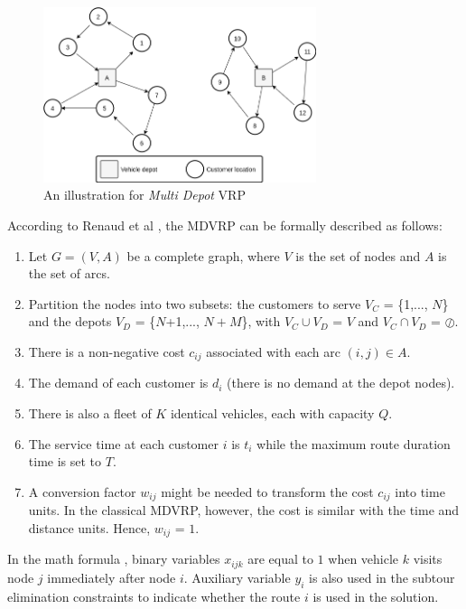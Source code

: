 \documentclass[conference]{IEEEtran}
\begin{document}
\begin{figure}[!]
	\centering
	\includegraphics[width=8cm]{Resources/Images/mdvrp-illustration}
	\caption{An illustration for \textit{Multi Depot} VRP}
	\label{fig:mdvrp-illustration}
\end{figure}


According to Renaud et al \cite{renaud_tabu_1996}, the MDVRP can be formally described as follows:
\begin{enumerate}
	\item Let $G = (V, A)$ be a complete graph, where $V$ is the set of nodes and $A$ is the set of arcs. 
	\item Partition the nodes into two subsets: the customers to serve $V_C$ = \{1,..., $N$\} and the depots $V_D$ = \{$N$+1,..., $N+M$\}, with $V_C \cup V_D$ = $V$ and $V_C \cap V_D$ = $\oslash$. 
	\item There is a non-negative cost $c_{ij}$ associated with each arc $(i, j) \in A$. 
	\item The demand of each customer is $d_i$ (there is no demand at the depot nodes).
	\item There is also a fleet of $K$ identical vehicles, each with capacity $Q$.
	\item The service time at each customer $i$ is $t_i$ while the maximum route duration time is set to $T$.
	\item A conversion factor $w_{ij}$ might be needed to transform the cost $c_{ij}$ into time units. In the classical MDVRP, however, the cost is similar with the time and distance units. Hence, $w_{ij}$ = $1$.
\end{enumerate} 

In the math formula \cite{kulkarni_integer_1985}, binary variables $x_{ijk}$ are equal to $1$ when vehicle $k$ visits node $j$ immediately after node $i$. Auxiliary variable $y_i$ is also used in the subtour elimination constraints to indicate whether the route $i$ is used in the solution. \\
\end{document}
